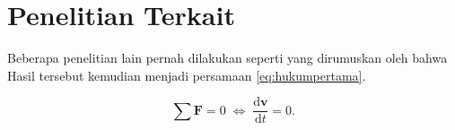 \section{Penelitian Terkait}
\label{sec:penelitianterkait}


Beberapa penelitian lain pernah dilakukan seperti yang dirumuskan oleh \citet{newton1687} bahwa \lipsum[5]
Hasil tersebut kemudian menjadi persamaan \ref{eq:hukumpertama}.

\begin{equation}
  \label{eq:hukumpertama}
  \sum \mathbf{F} = 0\; \Leftrightarrow\; \frac{\mathrm{d} \mathbf{v} }{\mathrm{d}t} = 0.
\end{equation}

\lipsum[6-7]
